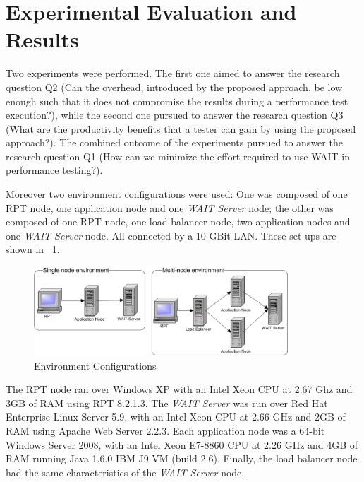 \documentclass[runningheads,a4paper]{llncs}
\begin{document}
\vspace{5pt}
\section{Experimental Evaluation and Results}
\vspace{-5pt}

Two experiments were performed. The first one aimed to answer the
research question Q2 (Can the overhead, introduced by the proposed approach, be
low enough such that it does not compromise the results during a performance
test execution?), while the second one pursued to answer the research question Q3 (What are the
productivity benefits that a tester can gain by using the proposed approach?).
The combined outcome of the experiments pursued to answer the research question
Q1 (How can we minimize the effort required to use WAIT in performance testing?).

Moreover two environment configurations were used: One was composed of one RPT
node, one application node and one \emph{WAIT Server} node; the other was composed of
one RPT node, one load balancer node, two application nodes and one \emph{WAIT
Server} node. All connected by a 10-GBit LAN. These set-ups are shown in
\figurename ~\ref{fig_env}.

\begin{figure}[!h]
\centering
\includegraphics[totalheight=.15\textheight,width=0.85\textwidth]{Environments}
\caption{Environment Configurations}
\label{fig_env}
\end{figure}

The RPT node ran over Windows XP with an Intel Xeon CPU at
2.67 Ghz and 3GB of RAM using RPT 8.2.1.3. The \emph{WAIT Server} was run over
Red Hat Enterprise Linux Server 5.9, with an Intel Xeon CPU at 2.66 GHz and 2GB of
RAM using Apache Web Server 2.2.3. Each application node was a 64-bit Windows
Server 2008, with an Intel Xeon E7-8860 CPU at 2.26 GHz and 4GB of RAM
running Java 1.6.0 IBM J9 VM (build 2.6). Finally, the load balancer node had
the same characteristics of the \emph{WAIT Server} node. 
\end{document}
